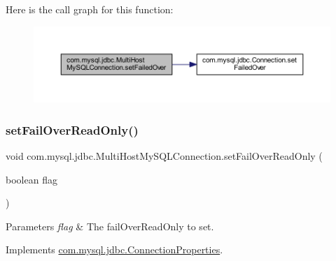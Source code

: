 Here is the call graph for this function\+:
\nopagebreak
\begin{figure}[H]
\begin{center}
\leavevmode
\includegraphics[width=350pt]{classcom_1_1mysql_1_1jdbc_1_1_multi_host_my_s_q_l_connection_af950571e47bab54277504fca71cbefd5_cgraph}
\end{center}
\end{figure}
\mbox{\label{classcom_1_1mysql_1_1jdbc_1_1_multi_host_my_s_q_l_connection_a17dcc1cedd18c886c23b8afd43a22cfe}} 
\subsubsection{\texorpdfstring{set\+Fail\+Over\+Read\+Only()}{setFailOverReadOnly()}}
{\footnotesize\ttfamily void com.\+mysql.\+jdbc.\+Multi\+Host\+My\+S\+Q\+L\+Connection.\+set\+Fail\+Over\+Read\+Only (\begin{DoxyParamCaption}\item[{boolean}]{flag }\end{DoxyParamCaption})}


\begin{DoxyParams}{Parameters}
{\em flag} & The fail\+Over\+Read\+Only to set. \\
\hline
\end{DoxyParams}


Implements \mbox{\hyperlink{interfacecom_1_1mysql_1_1jdbc_1_1_connection_properties_acc1561f34ff6aaa02a3a6c0e6184644f}{com.\+mysql.\+jdbc.\+Connection\+Properties}}.

